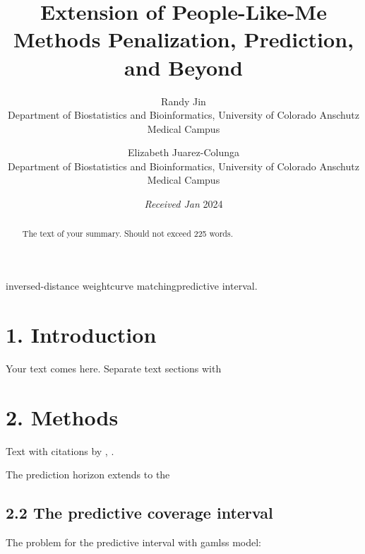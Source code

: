 \documentclass[useAMS,usenatbib,referee]{biom}
\title[]{Extension of People-Like-Me Methods Penalization, Prediction,
and Beyond}
\author{ Randy
Jin \email{\href{mailto:xin.2.jin@cuanschutz.edu}{\nolinkurl{xin.2.jin@cuanschutz.edu}}} \\ Department
of Biostatistics and Bioinformatics, University of Colorado Anschutz
Medical Campus  \and
		 Elizabeth
Juarez-Colunga \email{\href{mailto:elizabeth.juarez-colunga@cuanschutz.edu}{\nolinkurl{elizabeth.juarez-colunga@cuanschutz.edu}}} \\ Department
of Biostatistics and Bioinformatics, University of Colorado Anschutz
Medical Campus 
	   }
\begin{document}
\date{{\it Received Jan} 2024}

\pagerange{\pageref{firstpage}--\pageref{lastpage}} 



\label{firstpage}


\begin{abstract}
The text of your summary. Should not exceed 225 words.
\end{abstract}

%
%

\begin{keywords}
inversed-distance weightcurve matchingpredictive interval.
\end{keywords}

\maketitle

\hypertarget{intro}{%
\section{1. Introduction}\label{intro}}

Your text comes here. Separate text sections with

\hypertarget{s:methods}{%
\section{2. Methods}\label{s:methods}}

Text with citations by \citet{heagerty2000time},
\citep{pepe2003statistical}.

The prediction horizon extends to the

\hypertarget{ss:pcr}{%
\subsection{2.2 The predictive coverage interval}\label{ss:pcr}}

The problem for the predictive interval with gamlss model:
\end{document}
